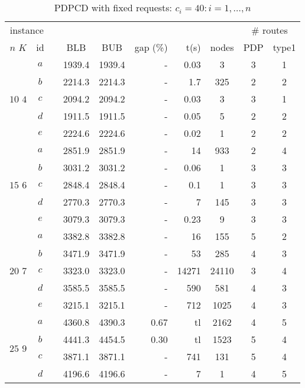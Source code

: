 \begin{table}[!htb]
\footnotesize
\caption{PDPCD with fixed requests: $c_i = 40:i = 1,\dots,n$}
\begin{tabular}{cccccrrccc}
\multicolumn{2}{c}{instance} & & & & & & & \multicolumn{2}{c}{\# routes} \\
 \cline{1-2} \cline{9-10}
$n$ \hspace{4mm} $K$ & id & & BLB & BUB & gap (\%) & t(s) & nodes & PDP & type1 \\
\hline
\multirow{5}{*}{$10$ \hspace{5mm} $4$}
& $a$ & & 1939.4 & 1939.4 & - & 0.03 & 3 & 3 & 1 \\
& $b$ & & 2214.3 & 2214.3 & - & 1.7 & 325 & 2 & 2 \\
& $c$ & & 2094.2 & 2094.2 & - & 0.03 & 3 & 3 & 1 \\
& $d$ & & 1911.5 & 1911.5 & - & 0.05 & 5 & 2 & 2 \\
& $e$ & & 2224.6 & 2224.6 & - & 0.02 & 1 & 2 & 2 \\
\hline
\multirow{5}{*}{$15$  \hspace{5mm} $6$}
& $a$ & & 2851.9 & 2851.9 & - & 14 & 933 & 2 & 4 \\
& $b$ & & 3031.2 & 3031.2 & - & 0.06 & 1 & 3 & 3 \\
& $c$ & & 2848.4 & 2848.4 & - & 0.1 & 1 & 3 & 3 \\
& $d$ & & 2770.3 & 2770.3 & - & 7 & 145 & 3 & 3 \\
& $e$ & & 3079.3 & 3079.3 & - & 0.23 & 9 & 3 & 3 \\
\hline
\multirow{5}{*}{$20$  \hspace{5mm} $7$}
& $a$ & & 3382.8 & 3382.8 & - & 16 & 155 & 5 & 2 \\
& $b$ & & 3471.9 & 3471.9 & - & 53 & 285 & 4 & 3 \\
& $c$ & & 3323.0 & 3323.0 & - & 14271 & 24110 & 3 & 4 \\
& $d$ & & 3585.5 & 3585.5 & - & 590 & 581 & 4 & 3 \\
& $e$ & & 3215.1 & 3215.1 & - & 712 & 1025 & 4 & 3 \\
\hline
\multirow{5}{*}{$25$  \hspace{5mm} $9$}
& $a$ & & 4360.8 & 4390.3 & 0.67 & tl & 2162 & 4 & 5 \\
& $b$ & & 4441.3 & 4454.5 & 0.30 & tl & 1523 & 5 & 4 \\
& $c$ & & 3871.1 & 3871.1 & - & 741 & 131 & 5 & 4 \\
& $d$ & & 4196.6 & 4196.6 & - & 7 & 1 & 4 & 5 \\

\end{tabular}
\end{table}
